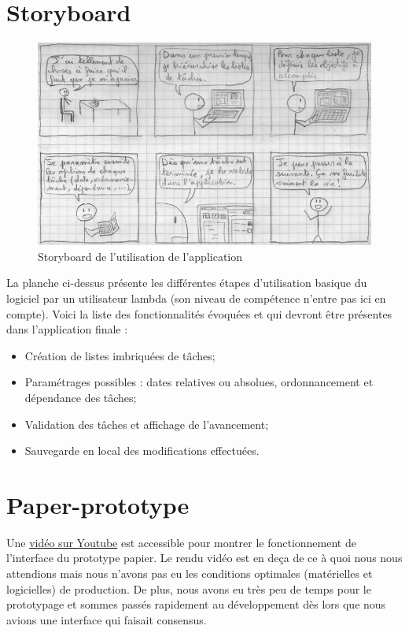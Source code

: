 	\section{Storyboard}
		\begin{figure}[h!]
		   \includegraphics{img/stotyboard_ihm.png}
		   \caption{Storyboard de l'utilisation de l'application}
		\end{figure}
	
		La planche ci-dessus présente les différentes étapes d'utilisation basique du logiciel par un utilisateur lambda (son niveau de compétence n'entre pas ici en compte). Voici la liste des fonctionnalités évoquées et qui devront être présentes dans l'application finale :
		\begin{itemize}
			\item Création de listes imbriquées de tâches;
			\item Paramétrages possibles : dates relatives ou absolues, ordonnancement et dépendance des tâches;
			\item Validation des tâches et affichage de l'avancement;
			\item Sauvegarde en local des modifications effectuées.
		\end{itemize}
	
	\section{Paper-prototype}
	Une \href{https://www.youtube.com/watch?v=xbLaZvgkzjQ}{vidéo sur Youtube} est accessible pour montrer le fonctionnement de l'interface du prototype papier. Le rendu vidéo est en deça de ce à quoi nous nous attendions mais nous n'avons pas eu les conditions optimales (matérielles et logicielles) de production. De plus, nous avons eu très peu de temps pour le prototypage et sommes passés rapidement au développement dès lors que nous avions une interface qui faisait consensus.
	
